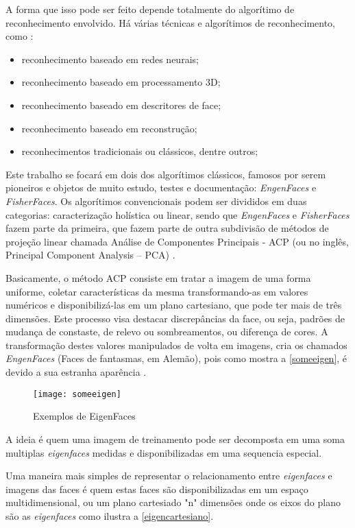 A forma que isso pode ser feito depende totalmente do algorítimo de reconhecimento envolvido. Há várias técnicas e algorítimos de reconhecimento, como \cite{issues_methods_FR}:

\begin{itemize}
	\item reconhecimento baseado em redes neurais;
	\item reconhecimento baseado em processamento 3D;
	\item reconhecimento baseado em descritores de face;
	\item reconhecimento baseado em reconstrução;
	\item reconhecimentos tradicionais ou clássicos, dentre outros;
\end{itemize}

Este trabalho se focará em dois dos algorítimos clássicos, famosos por serem pioneiros e objetos de muito estudo, testes e documentação: \textit{EngenFaces} e \textit{FisherFaces}. Os algorítimos convencionais podem ser divididos em duas categorias: caracterização holística ou linear, sendo que \textit{EngenFaces} e \textit{FisherFaces} fazem parte da primeira, que fazem parte de outra subdivisão de métodos de projeção linear chamada Análise de Componentes Principais - ACP (ou no inglês, Principal Component Analysis – PCA) \cite{issues_methods_FR}.

Basicamente, o método ACP consiste em tratar a imagem de uma forma uniforme, coletar características da mesma transformando-as em valores numéricos e disponibilizá-las em um plano cartesiano, que pode ter mais de três dimensões. Este processo visa destacar discrepâncias da face, ou seja, padrões de mudança de constaste, de relevo ou sombreamentos, ou diferença de cores. A transformação destes valores manipulados de volta em imagens, cria os chamados \textit{EngenFaces} (Faces de fantasmas, em Alemão), pois como mostra a \autoref{someeigen}, é devido a sua estranha aparência \cite{drmathew_java_programming}.

\begin{figure}[h]
	\centering
	\texttt{[image: someeigen]}
	\caption{Exemplos de EigenFaces}
	\label{someeigen}
\end{figure}

A ideia é quem uma imagem de treinamento pode ser decomposta em uma soma multiplas \textit{eigenfaces} medidas e disponibilizadas em uma sequencia especial.

Uma maneira mais simples de representar o relacionamento entre \textit{eigenfaces} e imagens das faces é quem estas faces são disponibilizadas em um espaço multidimensional, ou um plano cartesiado "n" dimensões onde os eixos do plano são as \textit{eigenfaces} \cite{drmathew_java_programming} como ilustra a  \autoref{eigencartesiano}.

